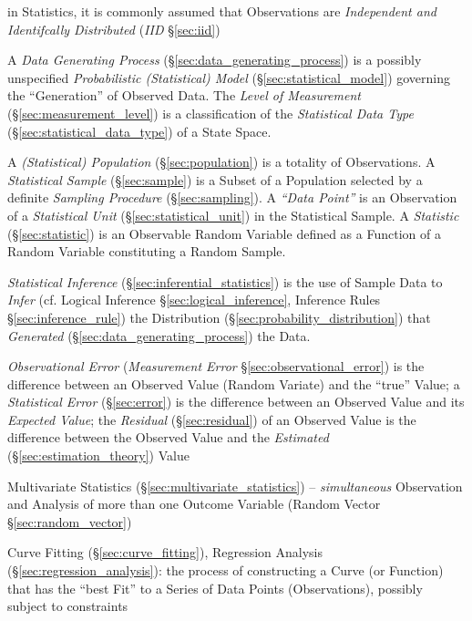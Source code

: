 in Statistics, it is commonly assumed that Observations are \emph{Independent
  and Identifcally Distributed} (\emph{IID} \S\ref{sec:iid})

\fist A \emph{Data Generating Process} (\S\ref{sec:data_generating_process})
is a possibly unspecified \emph{Probabilistic (Statistical) Model}
(\S\ref{sec:statistical_model}) governing the ``Generation'' of Observed Data.
The \emph{Level of Measurement} (\S\ref{sec:measurement_level}) is a
classification of the \emph{Statistical Data Type}
(\S\ref{sec:statistical_data_type}) of a State Space.

\fist A \emph{(Statistical) Population} (\S\ref{sec:population}) is a totality
of Observations. A \emph{Statistical Sample} (\S\ref{sec:sample}) is
a Subset of a Population selected by a definite \emph{Sampling Procedure}
(\S\ref{sec:sampling}). A \emph{``Data Point''} is an Observation of a
\emph{Statistical Unit} (\S\ref{sec:statistical_unit}) in the Statistical
Sample. A \emph{Statistic} (\S\ref{sec:statistic}) is an Observable Random
Variable defined as a Function of a Random Variable constituting a Random
Sample.

\fist \emph{Statistical Inference} (\S\ref{sec:inferential_statistics}) is the
use of Sample Data to \emph{Infer} (cf. Logical Inference
\S\ref{sec:logical_inference}, Inference Rules \S\ref{sec:inference_rule}) the
Distribution (\S\ref{sec:probability_distribution}) that \emph{Generated}
(\S\ref{sec:data_generating_process}) the Data.

\fist \emph{Observational Error} (\emph{Measurement Error}
\S\ref{sec:observational_error}) is the
difference between an Observed Value (Random Variate) and the ``true'' Value;
a \emph{Statistical Error} (\S\ref{sec:error}) is the difference between an
Observed Value and its \emph{Expected Value};
the \emph{Residual} (\S\ref{sec:residual}) of an Observed Value is the
difference between the Observed Value and the \emph{Estimated}
(\S\ref{sec:estimation_theory}) Value

\fist Multivariate Statistics (\S\ref{sec:multivariate_statistics}) --
\emph{simultaneous} Observation and Analysis of more than one Outcome Variable
(Random Vector \S\ref{sec:random_vector})

\fist Curve Fitting (\S\ref{sec:curve_fitting}), Regression Analysis
(\S\ref{sec:regression_analysis}): the process of constructing a Curve (or
Function) that has the ``best Fit'' to a Series of Data Points (Observations),
possibly subject to constraints

